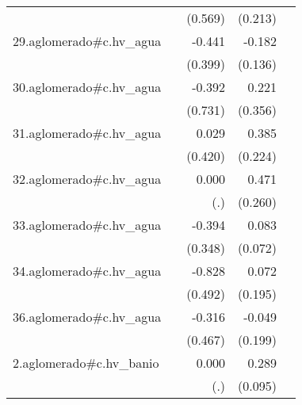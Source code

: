 {\begin{longtable}{l*{4}{D{.}{.}{-1}}}
            &                     &     (0.569)         &     (0.213)         &                     \\
\addlinespace
29.aglomerado#c.hv\_agua&                     &      -0.441         &      -0.182         &                     \\
            &                     &     (0.399)         &     (0.136)         &                     \\
\addlinespace
30.aglomerado#c.hv\_agua&                     &      -0.392         &       0.221         &                     \\
            &                     &     (0.731)         &     (0.356)         &                     \\
\addlinespace
31.aglomerado#c.hv\_agua&                     &       0.029         &       0.385         &                     \\
            &                     &     (0.420)         &     (0.224)         &                     \\
\addlinespace
32.aglomerado#c.hv\_agua&                     &       0.000         &       0.471         &                     \\
            &                     &         (.)         &     (0.260)         &                     \\
\addlinespace
33.aglomerado#c.hv\_agua&                     &      -0.394         &       0.083         &                     \\
            &                     &     (0.348)         &     (0.072)         &                     \\
\addlinespace
34.aglomerado#c.hv\_agua&                     &      -0.828         &       0.072         &                     \\
            &                     &     (0.492)         &     (0.195)         &                     \\
\addlinespace
36.aglomerado#c.hv\_agua&                     &      -0.316         &      -0.049         &                     \\
            &                     &     (0.467)         &     (0.199)         &                     \\
\addlinespace
2.aglomerado#c.hv\_banio&                     &       0.000         &       0.289\sym{**} &                     \\
            &                     &         (.)         &     (0.095)         &                     \\

\end{longtable}}

